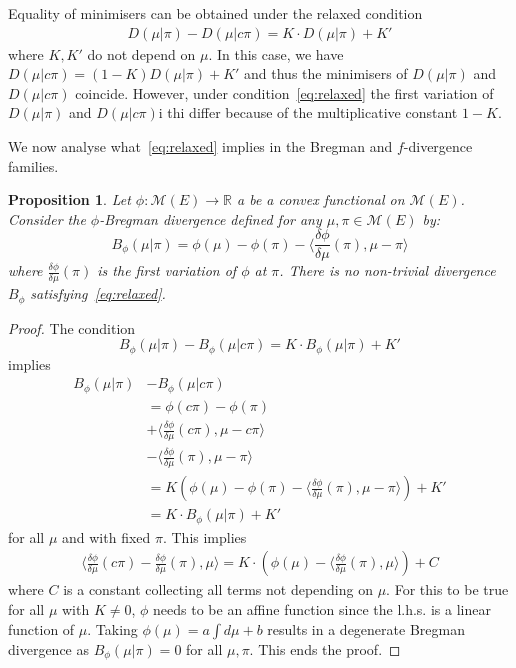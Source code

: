 \documentclass{article}
\newcommand{\cM}{\mathcal M}
\newcommand{\R}{\mathbb R}
\newcommand{\X}{E}
\newcommand{\ssp}[1]{\langle #1 \rangle}
\newtheorem{proposition}{Proposition}
\begin{document}
Equality of minimisers can be obtained under the relaxed condition
\begin{align}
\label{eq:relaxed}
    D(\mu|\pi)-D(\mu|c\pi) = K\cdot D(\mu|\pi)+K'
\end{align}
where $K, K'$ do not depend on $\mu$. In this case, we have $D(\mu|c\pi)=(1-K)D(\mu|\pi)+K'$ and thus the minimisers of $D(\mu|\pi)$ and $D(\mu|c\pi)$ coincide.
However, under condition~\eqref{eq:relaxed} the first variation of $D(\mu|\pi)$ and $D(\mu|c\pi)$i thi differ because of the multiplicative constant $1-K$.

We now analyse what~\eqref{eq:relaxed} implies in the Bregman and $f$-divergence families.

\begin{proposition}
    Let  $\phi:\cM(\X)\rightarrow \R$ a be a convex functional on $\cM(\X)$. Consider the $\phi$-Bregman divergence defined for any $\mu, \pi \in \cM(\X)$ by:
\begin{equation*}
     B_{\phi}(\mu|\pi)=\phi(\mu)-\phi(\pi)-\ssp{\frac{\delta \phi}{\delta \mu}(\pi), \mu- \pi}
\end{equation*}
where $\frac{\delta \phi}{\delta \mu}(\pi)$ is the first variation of $\phi$ at $\pi$.
There is no non-trivial divergence $B_{\phi}$ satisfying~\eqref{eq:relaxed}.
\end{proposition}
\begin{proof}
    The condition $$B_\phi(\mu| \pi) - B_\phi(\mu| c\pi) = K \cdot B_\phi(\mu|\pi)+K'$$ implies
\begin{align*}
    B_\phi(\mu|\pi)& - B_\phi(\mu|c\pi) \\
    &= \phi(c\pi)-\phi(\pi) \\
   &+\ssp{\frac{\delta \phi}{\delta \mu}(c\pi), \mu-c\pi} \\
   &-\ssp{\frac{\delta \phi}{\delta \mu}(\pi), \mu-\pi}\\ &= K \left(\phi(\mu)-\phi(\pi)-\ssp{\frac{\delta \phi}{\delta \mu}(\pi), \mu- \pi}\right)+K'\\
   &=K\cdot B_{\phi}(\mu|\pi) +K'
\end{align*}
for all $\mu$ and with fixed $\pi$. This implies 
\begin{align*}
  \ssp{\frac{\delta \phi}{\delta \mu}(c\pi)-\frac{\delta \phi}{\delta \mu}(\pi), \mu} = K\cdot \left(\phi(\mu)-\ssp{\frac{\delta \phi}{\delta \mu}(\pi), \mu}\right)+C
\end{align*}
where $C$ is a constant collecting all terms not depending on $\mu$. For this to be true for all $\mu$ with $K\neq 0$, $\phi$ needs to be an affine function since the l.h.s. is a linear function of $\mu$. Taking $\phi(\mu) = a\int d\mu+b$ results in a degenerate Bregman divergence as $B_{\phi}(\mu|\pi) = 0$ for all $\mu, \pi$. This ends the proof.
\end{proof}
\end{document}
